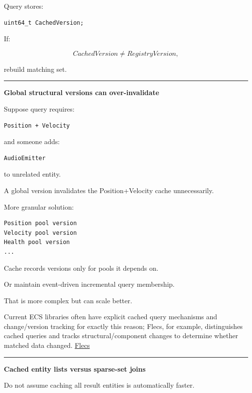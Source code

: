 Query stores:

\begin{verbatim}
uint64_t CachedVersion;
\end{verbatim}

If:

\[
CachedVersion\neq RegistryVersion,
\]

rebuild matching set.

\begin{center}\rule{0.5\linewidth}{0.5pt}\end{center}

\textbf{Global structural versions can over-invalidate}

Suppose query requires:

\begin{verbatim}
Position + Velocity
\end{verbatim}

and someone adds:

\begin{verbatim}
AudioEmitter
\end{verbatim}

to unrelated entity.

A global version invalidates the Position+Velocity cache unnecessarily.

More granular solution:

\begin{verbatim}
Position pool version
Velocity pool version
Health pool version
...
\end{verbatim}

Cache records versions only for pools it depends on.

Or maintain event-driven incremental query membership.

That is more complex but can scale better.

Current ECS libraries often have explicit cached query mechanisms and change/version tracking for exactly this reason; Flecs, for example, distinguishes cached queries and tracks structural/component changes to determine whether matched data changed. \href{https://www.flecs.dev/flecs/Queries.html?utm_source=chatgpt.com}{Flecs}

\begin{center}\rule{0.5\linewidth}{0.5pt}\end{center}

\textbf{Cached entity lists versus sparse-set joins}

Do not assume caching all result entities is automatically faster.


